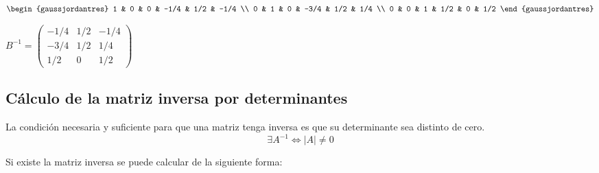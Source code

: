 \begin{ejemplo}
$\begin{gaussjordantres} 
1 & 0 & 0 & -1/4 & 1/2 & -1/4 \\
0 & 1 & 0 & -3/4 & 1/2 & 1/4 \\
0 & 0 & 1 & 1/2 & 0 & 1/2
\end{gaussjordantres} $

$B^{-1}=\begin{pmatrix}
-1/4 & 1/2 & -1/4 \\
 -3/4 & 1/2 & 1/4 \\
 1/2 & 0 & 1/2
\end{pmatrix} $

\end{ejemplo}
\subsection{Cálculo de la matriz inversa por determinantes}

\begin{definicion}
La condición necesaria y suficiente para que una matriz tenga inversa es que su determinante sea distinto de cero.
\[ \exists A^{-1} \Leftrightarrow |A| \neq 0 \]

Si existe la matriz inversa se puede calcular de la siguiente forma:



\end{definicion}


